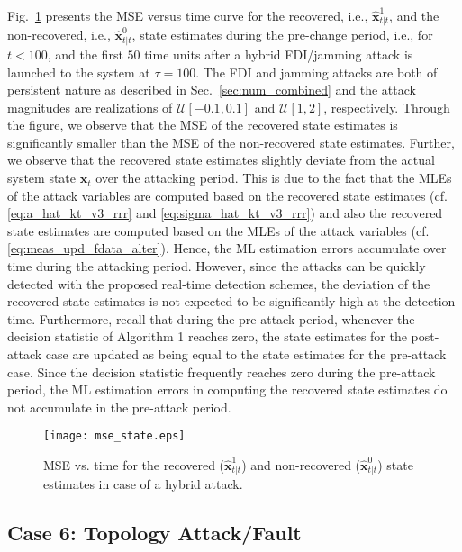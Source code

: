 \documentclass[onecolumn]{IEEEtran}
\begin{document}
Fig.~\ref{fig:mse_state} presents the MSE versus time curve for the recovered, i.e., $\hat{\mathbf{x}}_{t|t}^1$, and the non-recovered, i.e., $\hat{\mathbf{x}}_{t|t}^0$, state estimates during the pre-change period, i.e., for $t < 100$, and the first $50$ time units after a hybrid FDI/jamming attack is launched to the system at $\tau = 100$. The FDI and jamming attacks are both of persistent nature as described in Sec.~\ref{sec:num_combined} and the attack magnitudes are realizations of $\mathcal{U}[-0.1,0.1]$ and $\mathcal{U}[1,2]$, respectively. Through the figure, we observe that the MSE of the recovered state estimates is significantly smaller than the MSE of the non-recovered state estimates. Further, we observe that the recovered state estimates slightly deviate from the actual system state $\mathbf{x}_t$ over the attacking period. This is due to the fact that the MLEs of the attack variables are computed based on the recovered state estimates (cf. \eqref{eq:a_hat_kt_v3_rrr} and \eqref{eq:sigma_hat_kt_v3_rrr}) and also the recovered state estimates are computed based on the MLEs of the attack variables (cf. \eqref{eq:meas_upd_fdata_alter}). Hence, the ML estimation errors accumulate over time during the attacking period. However, since the attacks can be quickly detected with the proposed real-time detection schemes, the deviation of the recovered state estimates is not expected to be significantly high at the detection time. Furthermore, recall that during the pre-attack period, whenever the decision statistic of Algorithm 1 reaches zero, the state estimates for the post-attack case are updated as being equal to the state estimates for the pre-attack case. Since the decision statistic frequently reaches zero during the pre-attack period, the ML estimation errors in computing the recovered state estimates do not accumulate in the pre-attack period.

\begin{figure}
\center
  \texttt{[image: mse\_state.eps]}
\caption{MSE vs. time for the recovered ($\hat{\mathbf{x}}_{t|t}^1$) and non-recovered ($\hat{\mathbf{x}}_{t|t}^0$) state estimates in case of a hybrid attack.}
 \label{fig:mse_state}
\end{figure}


\subsection{{Case 6: Topology Attack/Fault}}
\end{document}
